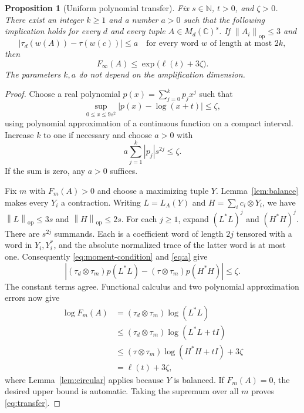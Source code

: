 \documentclass[11pt]{article}
\newtheorem{proposition}[theorem]{Proposition}
\theoremstyle{remark}
\newcommand{\C}{\mathbb C}
\newcommand{\N}{\mathbb N}
\newcommand{\M}{M}
\newcommand{\op}{\mathrm{op}}
\newcommand{\Finf}{F_{\infty}}
\newcommand{\norm}[1]{\left\lVert#1\right\rVert}
\newcommand{\abs}[1]{\left\lvert#1\right\rvert}
\begin{document}
\begin{proposition}[Uniform polynomial transfer]\label{prop:transfer}
Fix $s\in\N$, $t>0$, and $\zeta>0$. There exist an integer
$k\geq1$ and a number $a>0$ such that the following implication
holds for every $d$ and every tuple $A\in\M_d(\C)^s$.
If $\norm{A_i}_{\op}\leq3$ and
\begin{equation}
 \abs{\tau_d(w(A))-\tau(w(c))}\leq a
       \quad\text{for every word $w$ of length at most $2k$},
       \label{eq:moment-condition}
\end{equation}
then
\begin{equation}
 \Finf(A)\leq \exp\bigl(\ell(t)+3\zeta\bigr).
       \label{eq:transfer}
\end{equation}
The parameters $k,a$ do not depend on the amplification dimension.
\end{proposition}

\begin{proof}
Choose a real polynomial $p(x)=\sum_{j=0}^k p_jx^j$ such that
\[
 \sup_{0\leq x\leq9s^2}\abs{p(x)-\log(x+t)}\leq\zeta,
\]
using polynomial approximation of a continuous function on a
compact interval. Increase $k$ to one if necessary and choose
$a>0$ with
\begin{equation}
 a\sum_{j=1}^k\abs{p_j}s^{2j}\leq\zeta. \label{eq:a}
\end{equation}
If the sum is zero, any $a>0$ suffices.

Fix $m$ with $F_m(A)>0$ and choose a maximizing tuple $Y$.
Lemma~\ref{lem:balance} makes every $Y_i$ a contraction.
Writing $L=L_A(Y)$ and $H=\sum_i c_i\otimes Y_i$, we have
$\norm{L}_{\op}\leq3s$ and $\norm{H}_{\op}\leq2s$.
For each $j\geq1$, expand $(L^*L)^j$ and $(H^*H)^j$.
There are $s^{2j}$ summands. Each is a coefficient word of length
$2j$ tensored with a word in $Y_i,Y_i^*$, and
the absolute normalized trace of the latter word is at most one.
Consequently \eqref{eq:moment-condition} and \eqref{eq:a} give
\[
 \abs{(\tau_d\otimes\tau_m)p(L^*L)
             -(\tau\otimes\tau_m)p(H^*H)}\leq\zeta.
\]
The constant terms agree. Functional calculus and two polynomial
approximation errors now give
\begin{align*}
 \log F_m(A)
   &=(\tau_d\otimes\tau_m)\log(L^*L)\\
   &\leq(\tau_d\otimes\tau_m)\log(L^*L+tI)\\
   &\leq(\tau\otimes\tau_m)\log(H^*H+tI)+3\zeta\\
   &=\ell(t)+3\zeta,
\end{align*}
where Lemma~\ref{lem:circular} applies because $Y$ is balanced.
If $F_m(A)=0$, the desired upper bound is automatic.
Taking the supremum over all $m$ proves \eqref{eq:transfer}.
\end{proof}
\end{document}
